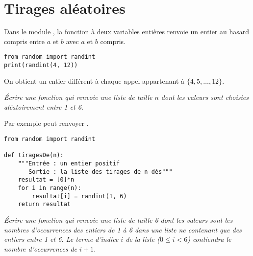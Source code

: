 \section{Tirages aléatoires  } 
Dans le module , la fonction à deux variables entières  renvoie un entier au hasard compris entre $a$ et $b$ avec $a$ et $b$ compris.
\begin{lstlisting}
from random import randint
print(randint(4, 12))
\end{lstlisting}
On obtient un entier différent à chaque appel appartenant à $\{4, 5, \ldots, 12\}$.
\begin{Exercise}[title= Tirages de dés]\it
Écrire une fonction  qui renvoie une liste de taille $n$ dont les valeurs sont choisies aléatoirement entre 1 et 6.

Par exemple  peut renvoyer 
\type{[6, 5, 3, 3, 2, 2, 6, 4, 6, 5, 6, 1]}.
\end{Exercise}
\begin{Answer}
\begin{lstlisting}
from random import randint

def tiragesDe(n):
 	"""Entrée : un entier positif
 	   Sortie : la liste des tirages de n dés""" 
    resultat = [0]*n
    for i in range(n):
        resultat[i] = randint(1, 6)
    return resultat
\end{lstlisting}
\end{Answer}
\begin{Exercise}[title= Occurrences]\it
Écrire une fonction  qui renvoie une liste de taille 6 dont les valeurs sont les nombres d’occurrences des entiers de 1 à 6 dans une liste ne contenant que des entiers entre 1 et 6. Le terme d'indice $i$ de la liste ($0\le i < 6$) contiendra le nombre d’occurrences de $i+1$.
\end{Exercise}
